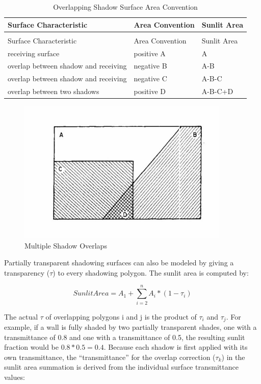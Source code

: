 \begin{longtable}[c]{>{\raggedright}p{2.9in}p{1.5in}p{1.59in}}
\caption{Overlapping Shadow Surface Area Convention \label{table:surface-area-characteristic-convention}} \tabularnewline
\toprule
Surface Characteristic & Area Convention & Sunlit Area \tabularnewline
\midrule
\endfirsthead

\caption[]{Overlapping Shadow Surface Area Convention} \tabularnewline
\toprule
Surface Characteristic & Area Convention & Sunlit Area \tabularnewline
\midrule
\endhead

receiving surface & positive A & A \tabularnewline
overlap between shadow and receiving & negative B & A-B \tabularnewline
overlap between shadow and receiving & negative C & A-B-C \tabularnewline
overlap between two shadows & positive D & A-B-C+D \tabularnewline
\bottomrule
\end{longtable}

\begin{figure}[hbtp] %
\centering
\includegraphics[width=0.9\textwidth, height=0.9\textheight, keepaspectratio=true]{media/image642.png}
\caption{Multiple Shadow Overlaps \protect \label{fig:multiple-shadow-overlaps}}
\end{figure}

Partially transparent shadowing surfaces can also be modeled by giving a transparency ($\tau$) to every shadowing polygon. The sunlit area is computed by:

\begin{equation}
SunlitArea = A_1 + {\sum\limits_{i = 2}^n {A_i}*(1-\tau_i)}
\end{equation}

The actual $\tau$ of overlapping polygons i and j is the product of $\tau_i$ and $\tau_j$. For example, if a wall is fully shaded by two partially transparent shades, one with a transmittance of 0.8 and one with a transmittance of 0.5, the resulting sunlit fraction would be $0.8 * 0.5 = 0.4$. Because each shadow is first applied with its own transmittance, the ``transmittance'' for the overlap correction ($\tau_k$) in the sunlit area summation is derived from the individual surface transmittance values:

